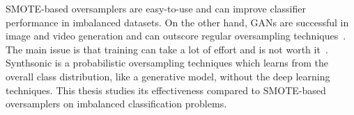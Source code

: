 SMOTE-based oversamplers are easy-to-use and can improve classifier performance in imbalanced datasets. On the other hand, GANs are successful in image and video generation and can outscore regular oversampling techniques~\cite{Douzas2018EffectiveNetworks}. The main issue is that training can take a lot of effort and is not worth it~\cite{Camino2020OversamplingEffort}. Synthsonic is a probabilistic oversampling techniques which learns from the overall class distribution, like a generative model, without the deep learning techniques. This thesis studies its effectiveness compared to SMOTE-based oversamplers on imbalanced classification problems.